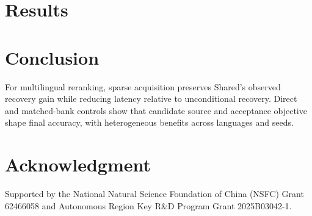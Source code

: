 \documentclass[conference,letterpaper]{IEEEtran}
\begin{document}
\section{Results}

\section{Conclusion}
For multilingual reranking, sparse acquisition preserves Shared's observed recovery gain while reducing latency relative to unconditional recovery. Direct and matched-bank controls show that candidate source and acceptance objective shape final accuracy, with heterogeneous benefits across languages and seeds.
\section*{Acknowledgment}
Supported by the National Natural Science Foundation of China (NSFC) Grant 62466058 and Autonomous Region Key R\&D Program Grant 2025B03042-1.
\label{iscas:body-end}\clearpage\raggedbottom\balance
\label{iscas:references-start}

\end{document}
